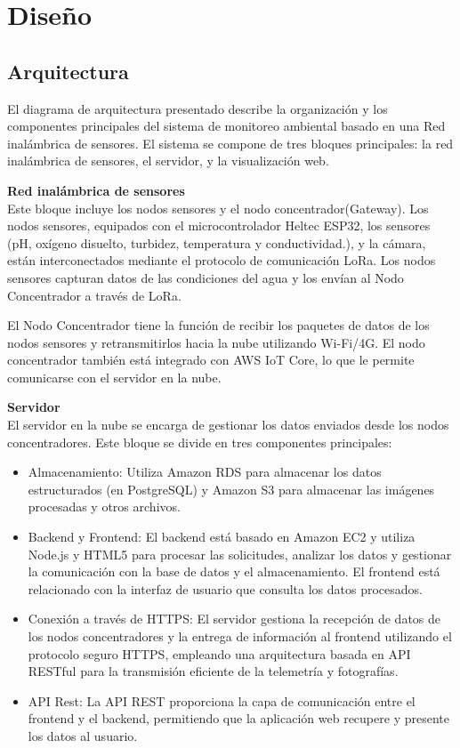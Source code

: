 \chapter{Diseño}


\section{Arquitectura}
\label{sec:arquitectura}

El diagrama de arquitectura presentado describe la organización y los componentes principales del sistema de monitoreo ambiental basado en una Red inalámbrica de sensores. El sistema se compone de tres bloques principales: la red inalámbrica de sensores, el servidor, y la visualización web.

\textbf{Red inalámbrica de sensores}\\
Este bloque incluye los nodos sensores y el nodo concentrador(Gateway). Los nodos sensores, equipados con el microcontrolador Heltec ESP32, los sensores (pH, oxígeno disuelto, turbidez, temperatura y conductividad.), y la cámara, están interconectados mediante el protocolo de comunicación LoRa. Los nodos sensores capturan datos de las condiciones del agua y los envían al Nodo Concentrador a través de LoRa.

El Nodo Concentrador tiene la función de recibir los paquetes de datos de los nodos sensores y retransmitirlos hacia la nube utilizando Wi-Fi/4G. El nodo concentrador también está integrado con AWS IoT Core, lo que le permite comunicarse con el servidor en la nube.

\textbf{Servidor}\\
El servidor en la nube se encarga de gestionar los datos enviados desde los nodos concentradores. Este bloque se divide en tres componentes principales:
\begin{itemize}
  \item Almacenamiento: Utiliza Amazon RDS para almacenar los datos estructurados (en PostgreSQL) y Amazon S3 para almacenar las imágenes procesadas y otros archivos.
  \item Backend y Frontend: El backend está basado en Amazon EC2 y utiliza Node.js y HTML5 para procesar las solicitudes, analizar los datos y gestionar la comunicación con la base de datos y el almacenamiento. El frontend está relacionado con la interfaz de usuario que consulta los datos procesados.
  \item Conexión a través de HTTPS: El servidor gestiona la recepción de datos de los nodos concentradores y la entrega de información al frontend utilizando el protocolo seguro HTTPS, empleando una arquitectura basada en API RESTful para la transmisión eficiente de la telemetría y fotografías.
  \item API Rest: La API REST proporciona la capa de comunicación entre el frontend y el backend, permitiendo que la aplicación web recupere y presente los datos al usuario.
\end{itemize}

